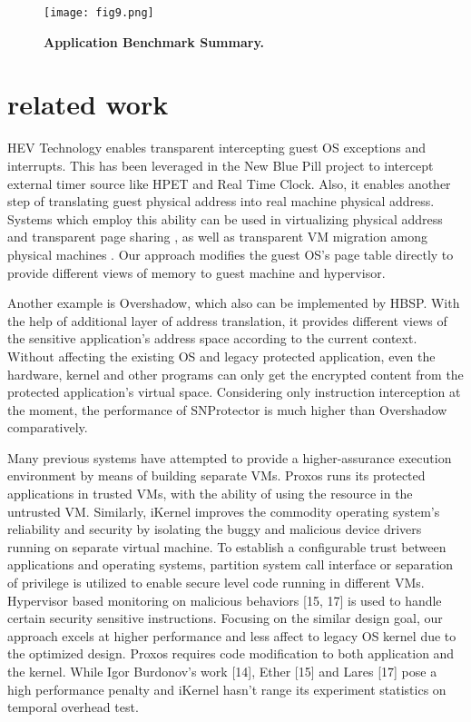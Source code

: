 \documentclass[conference]{IEEEtran}
\begin{document}
{\begin{figure}[!htb]
\centering
\texttt{[image: fig9.png]}
\caption{{\bf Application Benchmark Summary.}} \label{Figure 8.}
\end{figure}


\bigskip

\section{related work}
HEV Technology enables transparent intercepting guest OS exceptions
and interrupts. This has been leveraged in the New Blue Pill project
to intercept external timer source like HPET and Real Time
Clock\cite{IEEEhowto:8}. Also, it enables another step of
translating guest physical address into real machine physical
address. Systems which employ this ability can be used in
virtualizing physical address\cite{IEEEhowto:9} and transparent page
sharing\cite{IEEEhowto:10} , as well as transparent VM migration
among physical machines \cite{IEEEhowto:11}. Our approach modifies
the guest OS's page table directly to provide different views of
memory to guest machine and hypervisor.

Another example is Overshadow\cite{IEEEhowto:6}, which also can be
implemented by HBSP. With the help of additional layer of address
translation, it provides different views of the sensitive
application's address space according to the current context.
Without affecting the existing OS and legacy protected
application, even the hardware, kernel and other programs can only
get the encrypted content from the protected application's virtual
space. Considering only instruction interception at the moment,
the performance of SNProtector is much higher than Overshadow
comparatively.

Many previous systems have attempted to provide a higher-assurance
execution environment by means of building separate VMs.
Proxos\cite{IEEEhowto:12} runs its protected applications in
trusted VMs, with the ability of using the resource in the
untrusted VM. Similarly, iKernel\cite{IEEEhowto:13} improves the
commodity operating system's reliability and security by isolating
the buggy and malicious device drivers running on separate virtual
machine. To establish a configurable trust between applications
and operating systems, partition system call interface  or
separation of privilege\cite{IEEEhowto:15} is utilized to enable
secure level code running in different VMs. Hypervisor based
monitoring on malicious behaviors [15, 17] is used to handle
certain security sensitive instructions. Focusing on the similar
design goal, our approach excels at higher performance and less
affect to legacy OS kernel due to the optimized design. Proxos
\cite{IEEEhowto:12} requires code modification to both application
and the kernel. While Igor Burdonov's work [14], Ether [15] and
Lares [17] pose a high performance penalty and iKernel
\cite{IEEEhowto:13} hasn't range its experiment statistics on
temporal overhead test.

}
\end{document}
